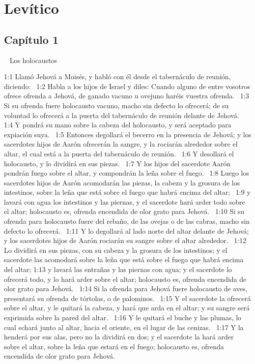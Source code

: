 \chapter{Levítico}

\section*{Capítulo 1} 
Los holocaustos 

 
1:1 Llamó Jehová a Moisés, y habló con él desde el tabernáculo de reunión, diciendo:  
1:2 Habla a los hijos de Israel y diles: Cuando alguno de entre vosotros ofrece ofrenda a Jehová, de ganado vacuno u ovejuno haréis vuestra ofrenda.  
1:3 Si su ofrenda fuere holocausto vacuno, macho sin defecto lo ofrecerá; de su voluntad lo ofrecerá a la puerta del tabernáculo de reunión delante de Jehová.  
1:4 Y pondrá su mano sobre la cabeza del holocausto, y será aceptado para expiación suya.  
1:5 Entonces degollará el becerro en la presencia de Jehová; y los sacerdotes hijos de Aarón ofrecerán la sangre, y la rociarán alrededor sobre el altar, el cual está a la puerta del tabernáculo de reunión.  
1:6 Y desollará el holocausto, y lo dividirá en sus piezas.  
1:7 Y los hijos del sacerdote Aarón pondrán fuego sobre el altar, y compondrán la leña sobre el fuego.  
1:8 Luego los sacerdotes hijos de Aarón acomodarán las piezas, la cabeza y la grosura de los intestinos, sobre la leña que está sobre el fuego que habrá encima del altar;  
1:9 y lavará con agua los intestinos y las piernas, y el sacerdote hará arder todo sobre el altar; holocausto es, ofrenda encendida de olor grato para Jehová.  
1:10 Si su ofrenda para holocausto fuere del rebaño, de las ovejas o de las cabras, macho sin defecto lo ofrecerá.  
1:11 Y lo degollará al lado norte del altar delante de Jehová; y los sacerdotes hijos de Aarón rociarán su sangre sobre el altar alrededor.  
1:12 Lo dividirá en sus piezas, con su cabeza y la grosura de los intestinos; y el sacerdote las acomodará sobre la leña que está sobre el fuego que habrá encima del altar; 
1:13 y lavará las entrañas y las piernas con agua; y el sacerdote lo ofrecerá todo, y lo hará arder sobre el altar; holocausto es, ofrenda encendida de olor grato para Jehová.  
1:14 Si la ofrenda para Jehová fuere holocausto de aves, presentará su ofrenda de tórtolas, o de palominos.  
1:15 Y el sacerdote la ofrecerá sobre el altar, y le quitará la cabeza, y hará que arda en el altar; y su sangre será exprimida sobre la pared del altar.  
1:16 Y le quitará el buche y las plumas, lo cual echará junto al altar, hacia el oriente, en el lugar de las cenizas.  
1:17 Y la henderá por sus alas, pero no la dividirá en dos; y el sacerdote la hará arder sobre el altar, sobre la leña que estará en el fuego; holocausto es, ofrenda encendida de olor grato para Jehová.  
